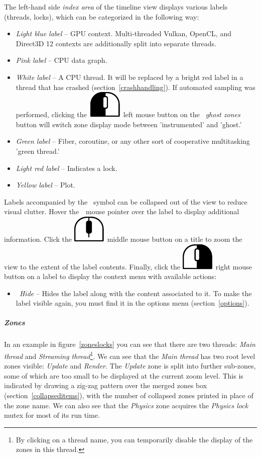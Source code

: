 \documentclass[hidelinks,titlepage,a4paper]{article}
\newcommand{\LMB}{\includegraphics[height=.8\baselineskip]{icons/lmb}}
\newcommand{\RMB}{\includegraphics[height=.8\baselineskip]{icons/rmb}}
\newcommand{\MMB}{\includegraphics[height=.8\baselineskip]{icons/mmb}}
\begin{document}
The left-hand side \emph{index area} of the timeline view displays various labels (threads, locks), which can be categorized in the following way:

\begin{itemize}
\item \emph{Light blue label} -- GPU context. Multi-threaded Vulkan, OpenCL, and Direct3D 12 contexts are additionally split into separate threads.
\item \emph{Pink label} -- CPU data graph.
\item \emph{White label} -- A CPU thread. It will be replaced by a bright red label in a thread that has crashed (section~\ref{crashhandling}). If automated sampling was performed, clicking the~\LMB{}~left mouse button on the \emph{\faGhost{}~ghost zones} button will switch zone display mode between 'instrumented' and 'ghost.'
\item \emph{Green label} -- Fiber, coroutine, or any other sort of cooperative multitasking 'green thread.'
\item \emph{Light red label} -- Indicates a lock.
\item \emph{Yellow label} -- Plot.
\end{itemize}

Labels accompanied by the \faCaretDown{}~symbol can be collapsed out of the view to reduce visual clutter. Hover the~\faMousePointer{}~mouse pointer over the label to display additional information. Click the \MMB{}~middle mouse button on a title to zoom the view to the extent of the label contents. Finally, click the \RMB{}~right mouse button on a label to display the context menu with available actions:

\begin{itemize}
\item \emph{\faEyeSlash{}~Hide} -- Hides the label along with the content associated to it. To make the label visible again, you must find it in the options menu (section~\ref{options}).
\end{itemize}

\subparagraph{Zones}

In an example in figure~\ref{zoneslocks} you can see that there are two threads: \emph{Main thread} and \emph{Streaming thread}\footnote{By clicking on a thread name, you can temporarily disable the display of the zones in this thread.}. We can see that the \emph{Main thread} has two root level zones visible: \emph{Update} and \emph{Render}. The \emph{Update} zone is split into further sub-zones, some of which are too small to be displayed at the current zoom level. This is indicated by drawing a zig-zag pattern over the merged zones box (section~\ref{collapseditems}), with the number of collapsed zones printed in place of the zone name. We can also see that the \emph{Physics} zone acquires the \emph{Physics lock} mutex for most of its run time.
\end{document}
